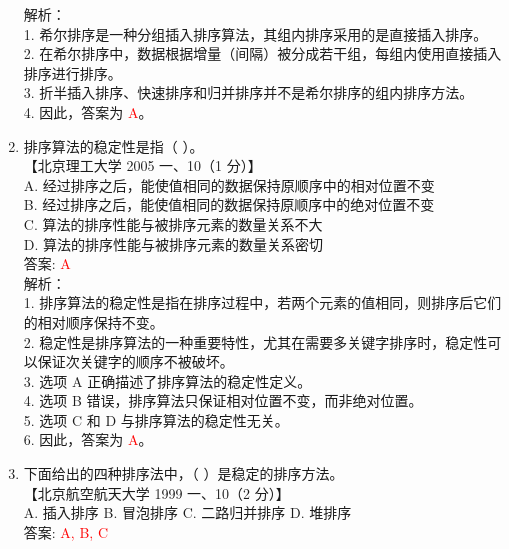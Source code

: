 \documentclass[lang=cn,newtx,10pt,scheme=chinese]{../../../elegantbook}
\begin{document}
\begin{enumerate}
    解析：\\
    1. 希尔排序是一种分组插入排序算法，其组内排序采用的是直接插入排序。\\
    2. 在希尔排序中，数据根据增量（间隔）被分成若干组，每组内使用直接插入排序进行排序。\\
    3. 折半插入排序、快速排序和归并排序并不是希尔排序的组内排序方法。\\
    4. 因此，答案为 \textcolor{red}{A}。\\

    \item 排序算法的稳定性是指（ ）。\\
    【北京理工大学 2005 一、10（1 分）】\\

    A. 经过排序之后，能使值相同的数据保持原顺序中的相对位置不变 \\  
    B. 经过排序之后，能使值相同的数据保持原顺序中的绝对位置不变 \\  
    C. 算法的排序性能与被排序元素的数量关系不大 \\  
    D. 算法的排序性能与被排序元素的数量关系密切 \\

    答案: \textcolor{red}{A} \\

    解析：\\
    1. 排序算法的稳定性是指在排序过程中，若两个元素的值相同，则排序后它们的相对顺序保持不变。\\
    2. 稳定性是排序算法的一种重要特性，尤其在需要多关键字排序时，稳定性可以保证次关键字的顺序不被破坏。\\
    3. 选项 A 正确描述了排序算法的稳定性定义。\\
    4. 选项 B 错误，排序算法只保证相对位置不变，而非绝对位置。\\
    5. 选项 C 和 D 与排序算法的稳定性无关。\\
    6. 因此，答案为 \textcolor{red}{A}。\\ 

    \item 下面给出的四种排序法中，（ ）是稳定的排序方法。\\
    【北京航空航天大学 1999 一、10（2 分）】\\

    A. 插入排序 \quad B. 冒泡排序 \quad C. 二路归并排序 \quad D. 堆排序 \\

    答案: \textcolor{red}{A, B, C} \\


\end{enumerate}
\end{document}
